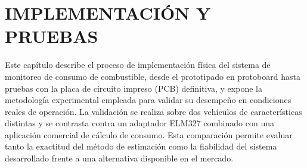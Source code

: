 
\chapter{IMPLEMENTACIÓN Y PRUEBAS}

Este capítulo describe el proceso de implementación física del sistema de monitoreo de consumo de combustible, desde el prototipado en protoboard hasta pruebas con la placa de circuito impreso (PCB) definitiva, y expone la metodología experimental empleada para validar su desempeño en condiciones reales de operación. La validación se realiza sobre dos vehículos de características distintas y se contrasta contra un adaptador ELM327 combinado con una aplicación comercial de cálculo de consumo. Esta comparación permite evaluar tanto la exactitud del método de estimación como la fiabilidad del sistema desarrollado frente a una alternativa disponible en el mercado.

